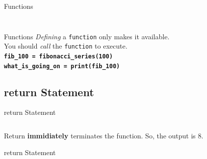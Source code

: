         \begin{frame}{Functions}
            \inputminted[frame=single,framesep=2pt]{python3}{code-examples/function_ex.py}
            \pause
            \inputminted[frame=single,framesep=2pt]{python3}{code-examples/function_ex2.py}
        \end{frame}

        \begin{frame}{Functions}
            \LARGE
            \textit{Defining} a \texttt{function} only makes it available.\\
            \pause 
            You should \textit{call} the \texttt{function} to execute.\\           
            \pause
            \newline
            \textbf{\texttt{fib\_100 = fibonacci\_series(100)}}\\
            \pause
            \textbf{\texttt{what\_is\_going\_on = print(fib\_100)}}\\
            \newline
        \end{frame}

      \subsection{return Statement}

        \begin{frame}{return Statement}
            \LARGE
            \pause
            \inputminted[frame=single,framesep=2pt]{python3}{code-examples/return.py}
            \pause
            Return \textbf{immidiately} terminates the function. So, the output is 8.
        \end{frame}

        \begin{frame}{return Statement}
            \LARGE
            \newline
            \newline
            \newline
        \end{frame}

